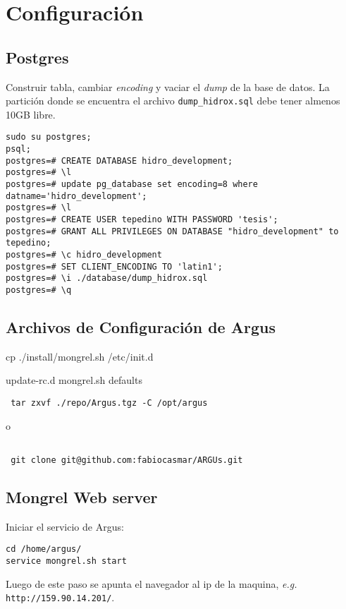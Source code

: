 \documentclass[spanish,10pt]{article}
\begin{document}
\section{Configuración}


\subsection{Postgres}
Construir tabla, cambiar \emph{encoding} y vaciar el \emph{dump} de la base de datos. La partición donde se encuentra el archivo 
\verb+dump_hidrox.sql+ debe tener almenos 10GB libre.
\begin{verbatim}
sudo su postgres; 
psql;
postgres=# CREATE DATABASE hidro_development;
postgres=# \l
postgres=# update pg_database set encoding=8 where datname='hidro_development';
postgres=# \l
postgres=# CREATE USER tepedino WITH PASSWORD 'tesis';
postgres=# GRANT ALL PRIVILEGES ON DATABASE "hidro_development" to tepedino;
postgres=# \c hidro_development
postgres=# SET CLIENT_ENCODING TO 'latin1';
postgres=# \i ./database/dump_hidrox.sql
postgres=# \q
\end{verbatim}
\subsection{Archivos de Configuración de Argus}
\item[] cp ./install/mongrel.sh /etc/init.d
\item[] update-rc.d mongrel.sh defaults
\begin{verbatim}
 tar zxvf ./repo/Argus.tgz -C /opt/argus
\end{verbatim}
o
\begin{verbatim}

 git clone git@github.com:fabiocasmar/ARGUs.git
\end{verbatim}
\subsection{Mongrel Web server}
Iniciar el servicio de Argus: 
\begin{verbatim}
cd /home/argus/
service mongrel.sh start
\end{verbatim}
Luego de este paso se apunta el navegador al ip de la maquina, \emph{e.g.} \texttt{http://159.90.14.201/}.
\end{document}
